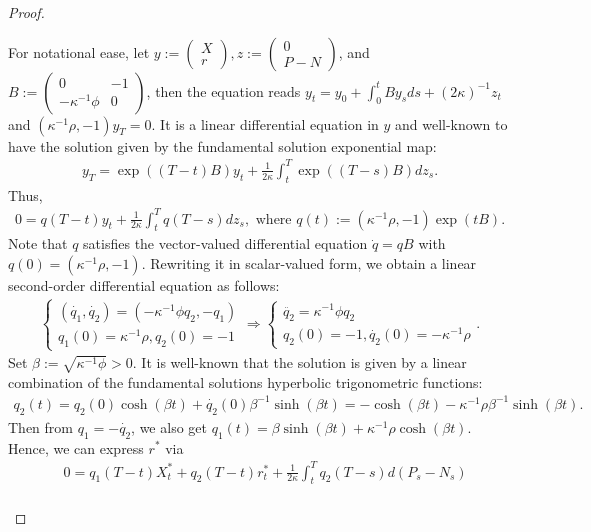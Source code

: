 \documentclass[openany,oneside]{article}
\theoremstyle{definition}
\theoremstyle{remark}
\begin{document}
\begin{proof}
\begin{enumerate}[Step 1.]
For notational ease, let $y:=\begin{pmatrix} X \\ r\end{pmatrix}, z:=\begin{pmatrix} 0 \\ P-N\end{pmatrix}$, and $B:=\begin{pmatrix} 0 & -1 \\ -\kappa^{-1}\phi & 0\end{pmatrix}$, then the equation reads $y_t = y_0 + \int_0^t B y_s ds + (2\kappa)^{-1}z_t$ and $(\kappa^{-1}\rho, -1)y_T = 0$. It is a linear differential equation in $y$ and well-known to have the solution given by the fundamental solution exponential map:
\begin{align*}
y_T = \exp((T-t)B)y_t + \frac{1}{2\kappa} \int_t^T \exp((T-s)B) dz_s.
\end{align*}
Thus,
\begin{align*}
0 = q(T-t)y_t + \frac{1}{2\kappa}\int_t^T q(T-s) dz_s, \textrm{ where } q(t):=(\kappa^{-1}\rho, -1)\exp(tB).
\end{align*}
Note that $q$ satisfies the vector-valued differential equation $\dot{q}=qB$ with $q(0)=(\kappa^{-1}\rho, -1)$. Rewriting it in scalar-valued form, we obtain a linear second-order differential equation as follows:
\begin{align*}
\begin{cases} (\dot{q_1},\dot{q_2})=(-\kappa^{-1}\phi q_2, -q_1) \\ q_1(0)=\kappa^{-1}\rho, q_2(0)=-1 \end{cases}
\Rightarrow \begin{cases}
\ddot{q_2}=\kappa^{-1}\phi q_2 \\ q_2(0)=-1, \dot{q_2}(0)=-\kappa^{-1}\rho
\end{cases}.
\end{align*}
Set $\beta:=\sqrt{\kappa^{-1}\phi}>0$. It is well-known that the solution is given by a linear combination of the fundamental solutions hyperbolic trigonometric functions:
\begin{align*}
q_2(t)=q_2(0)\cosh(\beta t)+\dot{q_2}(0)\beta^{-1}\sinh(\beta t) = -\cosh(\beta t)-\kappa^{-1}\rho\beta^{-1}\sinh(\beta t).
\end{align*}
Then from $q_1=-\dot{q_2}$, we also get $q_1(t)=\beta\sinh(\beta t)+\kappa^{-1}\rho\cosh(\beta t)$. Hence, we can express $r^\ast$ via
\begin{align*}
& 0=q_1(T-t)X^\ast_t+q_2(T-t)r^\ast_t+\frac{1}{2\kappa}\int_t^T q_2(T-s) d(P_s-N_s) \\

\end{align*}
\end{enumerate}
\end{proof}
\end{document}
